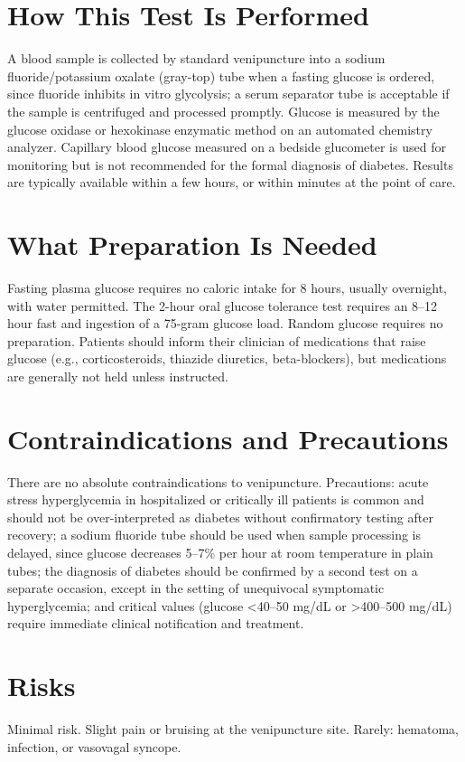 \section*{How This Test Is Performed}
A blood sample is collected by standard venipuncture into a sodium fluoride/potassium oxalate (gray-top) tube when a fasting glucose is ordered, since fluoride inhibits in vitro glycolysis; a serum separator tube is acceptable if the sample is centrifuged and processed promptly. Glucose is measured by the glucose oxidase or hexokinase enzymatic method on an automated chemistry analyzer. Capillary blood glucose measured on a bedside glucometer is used for monitoring but is not recommended for the formal diagnosis of diabetes. Results are typically available within a few hours, or within minutes at the point of care.
\section*{What Preparation Is Needed}
Fasting plasma glucose requires no caloric intake for 8 hours, usually overnight, with water permitted. The 2-hour oral glucose tolerance test requires an 8--12 hour fast and ingestion of a 75-gram glucose load. Random glucose requires no preparation. Patients should inform their clinician of medications that raise glucose (e.g., corticosteroids, thiazide diuretics, beta-blockers), but medications are generally not held unless instructed.
\section*{Contraindications and Precautions}
There are no absolute contraindications to venipuncture. Precautions: acute stress hyperglycemia in hospitalized or critically ill patients is common and should not be over-interpreted as diabetes without confirmatory testing after recovery; a sodium fluoride tube should be used when sample processing is delayed, since glucose decreases 5--7\% per hour at room temperature in plain tubes; the diagnosis of diabetes should be confirmed by a second test on a separate occasion, except in the setting of unequivocal symptomatic hyperglycemia; and critical values (glucose <40--50 mg/dL or >400--500 mg/dL) require immediate clinical notification and treatment.
\section*{Risks}
Minimal risk. Slight pain or bruising at the venipuncture site. Rarely: hematoma, infection, or vasovagal syncope.
